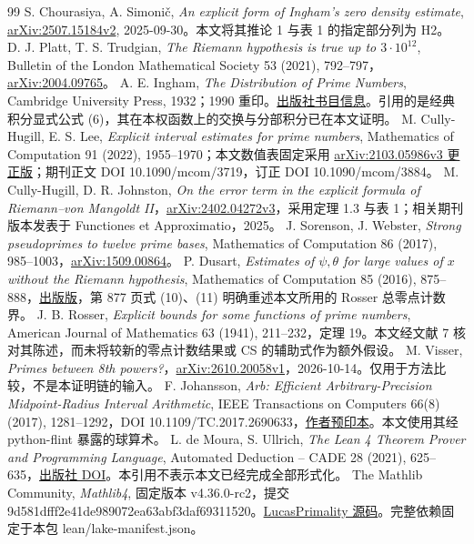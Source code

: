 \documentclass[UTF8,zihao=-4,fontset=fandol]{ctexart}
\begin{document}
\begingroup\small\begin{thebibliography}{99}
 S. Chourasiya, A. Simonič, \emph{An explicit form of Ingham's zero density estimate}, \href{https://arxiv.org/abs/2507.15184v2}{arXiv:2507.15184v2}, 2025-09-30。本文将其推论 1 与表 1 的指定部分列为 H2。
 D. J. Platt, T. S. Trudgian, \emph{The Riemann hypothesis is true up to \(3\cdot10^{12}\)}, Bulletin of the London Mathematical Society 53 (2021), 792–797，\href{https://arxiv.org/abs/2004.09765}{arXiv:2004.09765}。
 A. E. Ingham, \emph{The Distribution of Prime Numbers}, Cambridge University Press, 1932；1990 重印。\href{https://assets.cambridge.org/97805213/97896/frontmatter/9780521397896_frontmatter.pdf}{出版社书目信息}。引用的是经典积分显式公式 (6)，其在本权函数上的交换与分部积分已在本文证明。
 M. Cully-Hugill, E. S. Lee, \emph{Explicit interval estimates for prime numbers}, Mathematics of Computation 91 (2022), 1955–1970；本文数值表固定采用 \href{https://arxiv.org/abs/2103.05986v3}{arXiv:2103.05986v3 更正版}；期刊正文 DOI 10.1090/mcom/3719，订正 DOI 10.1090/mcom/3884。
 M. Cully-Hugill, D. R. Johnston, \emph{On the error term in the explicit formula of Riemann–von Mangoldt II}，\href{https://arxiv.org/abs/2402.04272v3}{arXiv:2402.04272v3}，采用定理 1.3 与表 1；相关期刊版本发表于 Functiones et Approximatio，2025。
 J. Sorenson, J. Webster, \emph{Strong pseudoprimes to twelve prime bases}, Mathematics of Computation 86 (2017), 985–1003，\href{https://arxiv.org/abs/1509.00864}{arXiv:1509.00864}。
 P. Dusart, \emph{Estimates of \(\psi,\theta\) for large values of \(x\) without the Riemann hypothesis}, Mathematics of Computation 85 (2016), 875–888，\href{https://www.ams.org/mcom/2016-85-298/S0025-5718-2015-03005-1/S0025-5718-2015-03005-1.pdf}{出版版}，第 877 页式 (10)、(11) 明确重述本文所用的 Rosser 总零点计数界。
 J. B. Rosser, \emph{Explicit bounds for some functions of prime numbers}, American Journal of Mathematics 63 (1941), 211–232，定理 19。本文经文献 7 核对其陈述，而未将较新的零点计数结果或 CS 的辅助式作为额外假设。
 M. Visser, \emph{Primes between 8th powers?}，\href{https://arxiv.org/abs/2610.20058v1}{arXiv:2610.20058v1}，2026-10-14。仅用于方法比较，不是本证明链的输入。
 F. Johansson, \emph{Arb: Efficient Arbitrary-Precision Midpoint-Radius Interval Arithmetic}, IEEE Transactions on Computers 66(8) (2017), 1281--1292，DOI 10.1109/TC.2017.2690633，\href{https://arxiv.org/abs/1611.02831}{作者预印本}。本文使用其经 python-flint 暴露的球算术。
 L. de Moura, S. Ullrich, \emph{The Lean 4 Theorem Prover and Programming Language}, Automated Deduction -- CADE 28 (2021), 625--635，\href{https://doi.org/10.1007/978-3-030-79876-5_37}{出版社 DOI}。本引用不表示本文已经完成全部形式化。
 The Mathlib Community, \emph{Mathlib4}, 固定版本 v4.36.0-rc2，提交 9d581dfff2e41de989072ea63abf3daf69311520。\href{https://github.com/leanprover-community/mathlib4/blob/9d581dfff2e41de989072ea63abf3daf69311520/Mathlib/NumberTheory/LucasPrimality.lean}{LucasPrimality 源码}。完整依赖固定于本包 lean/lake-manifest.json。
\end{thebibliography}\endgroup
\end{document}
